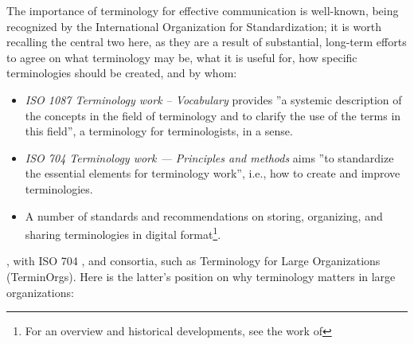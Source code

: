 \documentclass[graybox,envcountchap,sectrefs]{svmono}
\begin{document}
The importance of terminology for effective communication is well-known, being recognized by the International Organization for Standardization; it is worth recalling the central two here, as they are a result of substantial, long-term efforts to agree on what terminology may be, what it is useful for, how specific terminologies should be created, and by whom:
\begin{itemize}
    \item \textit{ISO 1087 Terminology work -- Vocabulary} provides ''a systemic description of the concepts in the field of terminology and to clarify the use of the terms in this field'', a terminology for terminologists, in a sense.
    \item \textit{ISO 704 Terminology work — Principles and
    methods} aims ''to standardize the essential elements for terminology work'', i.e., how to create and improve terminologies.
    \item A number of standards and recommendations on storing, organizing, and sharing terminologies in digital format\footnote{For an overview and historical developments, see the work of }.
\end{itemize}



, with ISO 704 \cite{iso704}, and consortia, such as Terminology for Large Organizations (TerminOrgs). Here is the latter's position on why terminology matters in large organizations:
\end{document}
